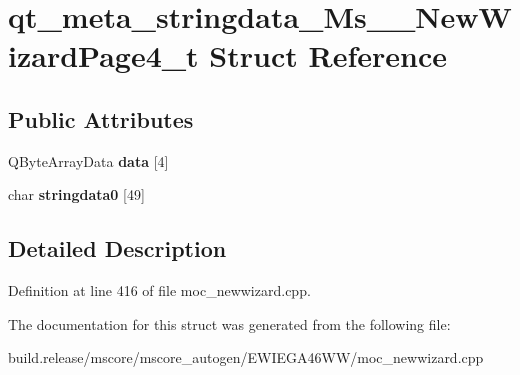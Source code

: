 \hypertarget{structqt__meta__stringdata___ms_____new_wizard_page4__t}{}\section{qt\+\_\+meta\+\_\+stringdata\+\_\+\+Ms\+\_\+\+\_\+\+New\+Wizard\+Page4\+\_\+t Struct Reference}
\label{structqt__meta__stringdata___ms_____new_wizard_page4__t}
\subsection*{Public Attributes}
\begin{DoxyCompactItemize}
\item 
\mbox{\label{structqt__meta__stringdata___ms_____new_wizard_page4__t_ada58c193ba77ce4efea83eb50a227baf}} 
Q\+Byte\+Array\+Data {\bfseries data} \mbox{[}4\mbox{]}
\item 
\mbox{\label{structqt__meta__stringdata___ms_____new_wizard_page4__t_ab96b489616a5cab40c6ca1785bf5ba63}} 
char {\bfseries stringdata0} \mbox{[}49\mbox{]}
\end{DoxyCompactItemize}


\subsection{Detailed Description}


Definition at line 416 of file moc\+\_\+newwizard.\+cpp.



The documentation for this struct was generated from the following file\+:\begin{DoxyCompactItemize}
\item 
build.\+release/mscore/mscore\+\_\+autogen/\+E\+W\+I\+E\+G\+A46\+W\+W/moc\+\_\+newwizard.\+cpp\end{DoxyCompactItemize}
